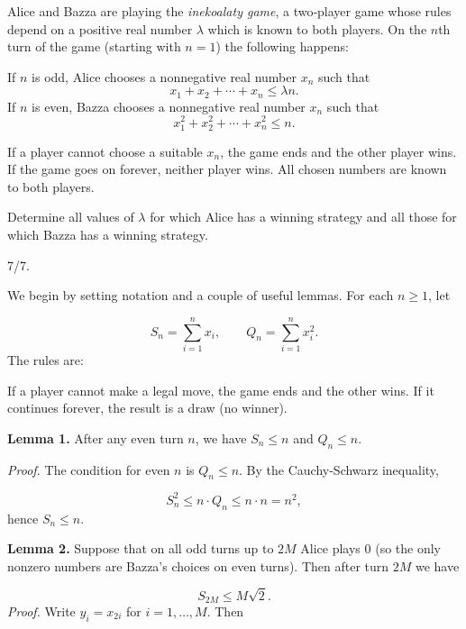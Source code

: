 \begin{mdframed}[style=mdpurplebox,frametitle={IMO 2025 Problem 5}]
Alice and Bazza are playing the \emph{inekoalaty game},
a two‑player game whose rules depend on a positive real number $\lambda$ which is known to both players.
On the $n$th turn of the game (starting with $n=1$) the following happens:
\begin{itemize}
  \ii If $n$ is odd, Alice chooses a nonnegative real number $x_n$ such that
  \[ x_1 + x_2 + \cdots + x_n \le \lambda n.  \]
  \ii If $n$ is even, Bazza chooses a nonnegative real number $x_n$ such that
  \[ x_1^2 + x_2^2 + \cdots + x_n^2 \le n.  \]
\end{itemize}
If a player cannot choose a suitable $x_n$, the game ends and the other player wins.
If the game goes on forever, neither player wins.
All chosen numbers are known to both players.

Determine all values of $\lambda$ for which Alice has a winning strategy
and all those for which Bazza has a winning strategy.
\end{mdframed}
\begin{remark*}
  7/7.
\end{remark*}
We begin by setting notation and a couple of useful lemmas. For each \(n\ge 1\), let\par
\[
S_n = \sum_{i=1}^n x_i, \qquad Q_n = \sum_{i=1}^n x_i^2.
\]
The rules are:\par
{}
If a player cannot make a legal move, the game ends and the other wins. If it continues forever, the result is a draw (no winner).\par
\smallskip
{}
\textbf{Lemma 1.} After any even turn \(n\), we have \(S_n\le n\) and \(Q_n\le n\).\par
\emph{Proof.} The condition for even \(n\) is \(Q_n\le n\). By the Cauchy-Schwarz inequality,\par
\[
S_n^2 \le n\cdot Q_n \le n\cdot n = n^2,
\]
hence \(S_n\le n\).\par
\textbf{Lemma 2.} Suppose that on all odd turns up to \(2M\) Alice plays \(0\) (so the only nonzero numbers are Bazza's choices on even turns). Then after turn \(2M\) we have\par
\[
S_{2M}\le M\sqrt{2}.
\]
\emph{Proof.} Write \(y_i=x_{2i}\) for \(i=1,\dots,M\). Then\par
